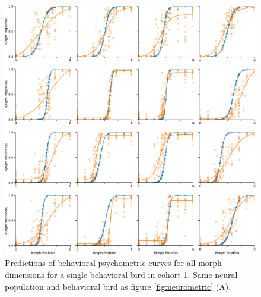 \begin{figure}[tbp] 
  \centering
  \includegraphics[width=174mm]{figures/supplemental/sfig06-neurometric-sample-all.pdf}
  \caption[All predicted Neurometric functions for a single population against a single behavioral subject]
{Predictions of behavioral psychometric curves for all morph dimensions for a single behavioral bird in cohort 1. Same neural population and behavioral bird as figure \ref{fig:neurometric} (A).
}
  \label{fig:neurometric-all}
\end{figure}